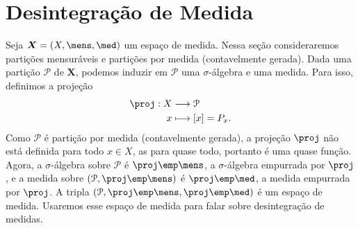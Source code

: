 





\section{Desintegração de Medida}

Seja $\bm X=(X,\mens,\med)$ um espaço de medida. Nessa seção consideraremos partições mensuráveis e partições por medida (contavelmente gerada). Dada uma partição $\mathcal P$ de $\bm X$, podemos induzir em $\mathcal P$ uma $\sigma$-álgebra e uma medida. Para isso, definimos a projeção
	\begin{align*}
	\func{\proj}{X}{\mathcal P}{x}{[x] = P_x}.
	\end{align*}
Como $\mathcal P$ é partição por medida (contavelmente gerada), a projeção $\proj$ não está definida para todo $x \in X$, as para quase todo, portanto é uma quase função. Agora, a $\sigma$-álgebra sobre $\mathcal P$ é $\proj\emp \mens$, a $\sigma$-álgebra empurrada por $\proj$, e a medida sobre $(\mathcal P,\proj\emp \mens)$ é $\proj\emp \med$, a medida empurrada por $\proj$. A tripla $(\mathcal P,\proj\emp\mens,\proj\emp\med)$ é um espaço de medida. Usaremos esse espaço de medida para falar sobre desintegração de medidas.

